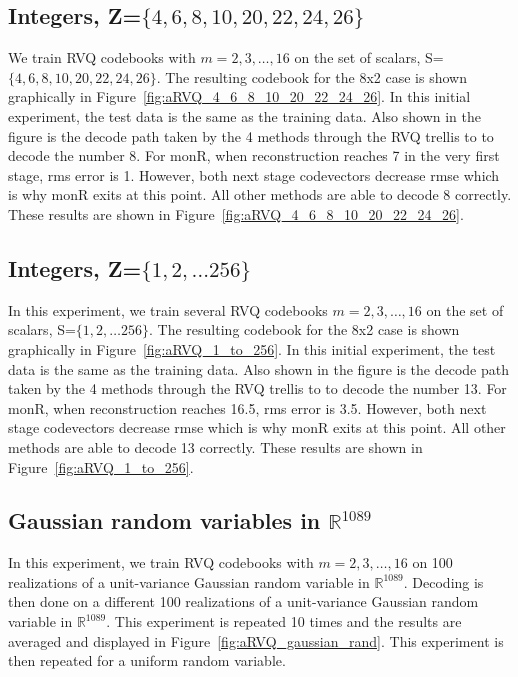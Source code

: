 \subsection{Integers, Z=$\{4, 6, 8, 10, 20, 22, 24, 26\}$}
We train RVQ codebooks with $m=2, 3, \ldots, 16$ on the set of scalars, S=$\{4, 6, 8, 10, 20, 22, 24, 26\}$.  The resulting codebook for the 8x2 case is shown graphically in Figure~\ref{fig:aRVQ_4_6_8_10_20_22_24_26}.  In this initial experiment, the test data is the same as the training data.  Also shown in the figure is the decode path taken by the 4 methods through the RVQ trellis to to decode the number 8.  For monR, when reconstruction reaches 7 in the very first stage, rms error is 1.  However, both next stage codevectors decrease rmse which is why monR exits at this point.  All other methods are able to decode 8 correctly.  These results are shown in Figure~\ref{fig:aRVQ_4_6_8_10_20_22_24_26}.  
  
 
\subsection{Integers, Z=$\{1, 2, \ldots 256\}$}
In this experiment, we train several RVQ codebooks $m=2, 3, \ldots, 16$ on the set of scalars, S=$\{1, 2, \ldots 256\}$.  The resulting codebook for the 8x2 case is shown graphically in Figure~\ref{fig:aRVQ_1_to_256}.  In this initial experiment, the test data is the same as the training data.  Also shown in the figure is the decode path taken by the 4 methods through the RVQ trellis to to decode the number 13.  For monR, when reconstruction reaches 16.5, rms error is 3.5.  However, both next stage codevectors decrease rmse which is why monR exits at this point.  All other methods are able to decode 13 correctly.   These results are shown in Figure~\ref{fig:aRVQ_1_to_256}. 

\subsection{Gaussian random variables in $\mathbb{R}^{1089}$}
In this experiment, we train RVQ codebooks with $m=2, 3, \ldots, 16$ on 100 realizations of a unit-variance Gaussian random variable in $\mathbb{R}^{1089}$.  Decoding is then done on a different 100 realizations of a unit-variance Gaussian random variable in $\mathbb{R}^{1089}$.  This experiment is repeated 10 times and the results are averaged and displayed in Figure~\ref{fig:aRVQ_gaussian_rand}.  This experiment is then repeated for a uniform random variable. 

